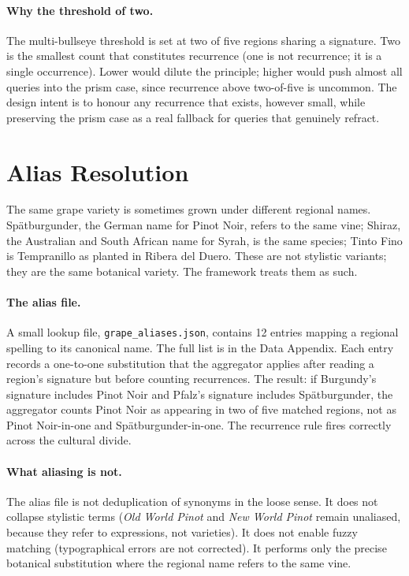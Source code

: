 \documentclass[11pt]{article}
\begin{document}
\paragraph{Why the threshold of two.}
The multi-bullseye threshold is set at two of five regions sharing a signature. Two is the smallest count that constitutes recurrence (one is not recurrence; it is a single occurrence). Lower would dilute the principle; higher would push almost all queries into the prism case, since recurrence above two-of-five is uncommon. The design intent is to honour any recurrence that exists, however small, while preserving the prism case as a real fallback for queries that genuinely refract.

\section{Alias Resolution}

The same grape variety is sometimes grown under different regional names. Spätburgunder, the German name for Pinot Noir, refers to the same vine; Shiraz, the Australian and South African name for Syrah, is the same species; Tinto Fino is Tempranillo as planted in Ribera del Duero. These are not stylistic variants; they are the same botanical variety. The framework treats them as such.

\paragraph{The alias file.}
A small lookup file, \texttt{grape\_aliases.json}, contains 12 entries mapping a regional spelling to its canonical name. The full list is in the Data Appendix. Each entry records a one-to-one substitution that the aggregator applies after reading a region's signature but before counting recurrences. The result: if Burgundy's signature includes Pinot Noir and Pfalz's signature includes Spätburgunder, the aggregator counts Pinot Noir as appearing in two of five matched regions, not as Pinot Noir-in-one and Spätburgunder-in-one. The recurrence rule fires correctly across the cultural divide.

\paragraph{What aliasing is not.}
The alias file is not deduplication of synonyms in the loose sense. It does not collapse stylistic terms (\emph{Old World Pinot} and \emph{New World Pinot} remain unaliased, because they refer to expressions, not varieties). It does not enable fuzzy matching (typographical errors are not corrected). It performs only the precise botanical substitution where the regional name refers to the same vine.
\end{document}
